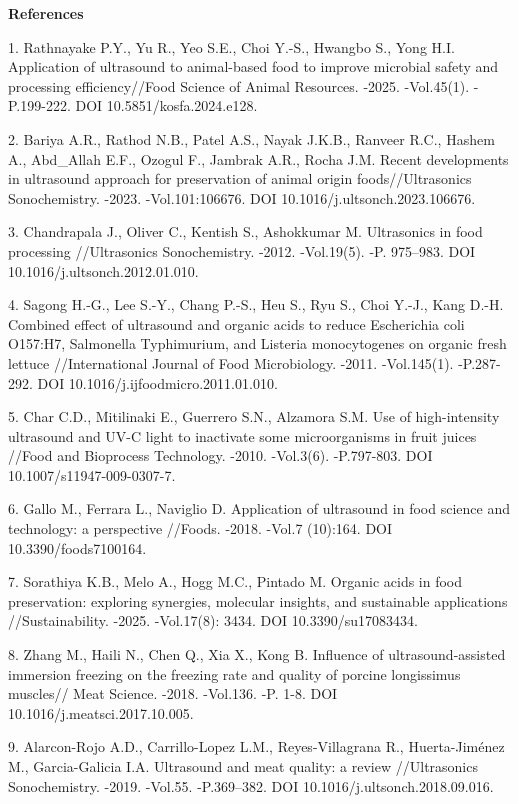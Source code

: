 \begin{center}
{\bfseries References}
\end{center}

\begin{refs}
1. Rathnayake P.Y., Yu R., Yeo S.E., Choi Y.-S., Hwangbo S., Yong H.I.
Application of ultrasound to animal-based food to improve microbial
safety and processing efficiency//Food Science of Animal Resources.
-2025. -Vol.45(1). -P.199-222. DOI 10.5851/kosfa.2024.e128.

2. Bariya A.R., Rathod N.B., Patel A.S., Nayak J.K.B., Ranveer R.C.,
Hashem A., Abd\_Allah E.F., Ozogul F., Jambrak A.R., Rocha J.M. Recent
developments in ultrasound approach for preservation of animal origin
foods//Ultrasonics Sonochemistry. -2023. -Vol.101:106676. DOI
10.1016/j.ultsonch.2023.106676.

3. Chandrapala J., Oliver C., Kentish S., Ashokkumar M. Ultrasonics in
food processing //Ultrasonics Sonochemistry. -2012. -Vol.19(5). -P.
975--983. DOI 10.1016/j.ultsonch.2012.01.010.

4. Sagong H.-G., Lee S.-Y., Chang P.-S., Heu S., Ryu S., Choi Y.-J.,
Kang D.-H. Combined effect of ultrasound and organic acids to reduce
Escherichia coli O157:H7, Salmonella Typhimurium, and Listeria
monocytogenes on organic fresh lettuce //International Journal of Food
Microbiology. -2011. -Vol.145(1). -P.287-292. DOI
10.1016/j.ijfoodmicro.2011.01.010.

5. Char C.D., Mitilinaki E., Guerrero S.N., Alzamora S.M. Use of
high-intensity ultrasound and UV-C light to inactivate some
microorganisms in fruit juices //Food and Bioprocess Technology. -2010.
-Vol.3(6). -P.797-803. DOI 10.1007/s11947-009-0307-7.

6. Gallo M., Ferrara L., Naviglio D. Application of ultrasound in food
science and technology: a perspective //Foods. -2018. -Vol.7 (10):164.
DOI 10.3390/foods7100164.

7. Sorathiya K.B., Melo A., Hogg M.C., Pintado M. Organic acids in food
preservation: exploring synergies, molecular insights, and sustainable
applications //Sustainability. -2025. -Vol.17(8): 3434. DOI
10.3390/su17083434.

8. Zhang M., Haili N., Chen Q., Xia X., Kong B. Influence of
ultrasound-assisted immersion freezing on the freezing rate and quality
of porcine longissimus muscles// Meat Science. -2018. -Vol.136. -P.
1-8. DOI 10.1016/j.meatsci.2017.10.005.

9. Alarcon-Rojo A.D., Carrillo-Lopez L.M., Reyes-Villagrana R.,
Huerta-Jiménez M., Garcia-Galicia I.A. Ultrasound and meat quality: a
review //Ultrasonics Sonochemistry. -2019. -Vol.55. -P.369--382. DOI
10.1016/j.ultsonch.2018.09.016.


\end{refs}
